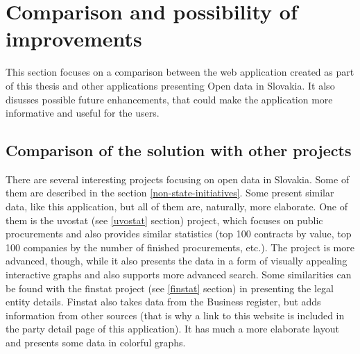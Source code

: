 \documentclass[thesis=B,english]{FITthesis}[2012/06/26]
\begin{document}
{	\section{Comparison and possibility of improvements}
	This section focuses on a comparison between the web application created as part of this thesis and other applications presenting Open data in Slovakia. It also disusses possible future enhancements, that could make the application more informative and useful for the users.
	\subsection{Comparison of the solution with other projects}
	There are several interesting projects focusing on open data in Slovakia. Some of them are described in  the section \ref{non-state-initiatives}. Some present similar data, like this application, but all of them are, naturally, more elaborate. One of them is the uvostat (see \ref{uvostat} section) project, which focuses on public procurements and also provides similar statistics (top 100 contracts by value, top 100 companies by the number of finished procurements, etc.). The project is more advanced, though, while it also presents the data in a form of visually appealing interactive graphs and also supports more advanced search. Some similarities can be found with the finstat project (see \ref{finstat} section) in presenting the legal entity details. Finstat also takes data from the Business register, but adds information from other sources (that is why a link to this website is included in the party detail page of this application). It has much a more elaborate layout and presents some data in colorful graphs. 
}
\end{document}
